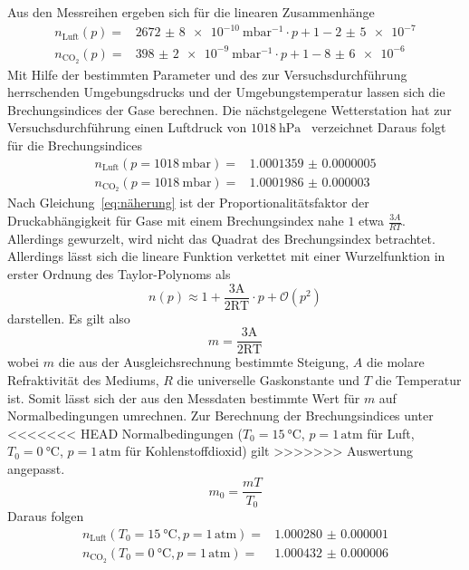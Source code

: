 Aus den Messreihen ergeben sich für die linearen Zusammenhänge
%
\begin{align}
  n_{\text{Luft}}(p)=&\SI{2672(8)e-10}{\milli\bar^{-1}}
  \cdot p+1-\num{2(5)e-7} \\
  n_{\text{CO}_2}(p)=&\SI{398(2)e-9}{\milli\bar^{-1}}
  \cdot p+1-\num{8(6)e-6}
\end{align}
%
Mit Hilfe der bestimmten Parameter und des zur Versuchsdurchführung herrschenden
Umgebungsdrucks und der Umgebungstemperatur lassen sich die Brechungsindices der
Gase berechnen. Die nächstgelegene Wetterstation hat zur Versuchsdurchführung
einen Luftdruck von $\SI{1018}{\hecto\pascal}$~\cite{wetteronline} verzeichnet
Daraus folgt für die Brechungsindices
%
\begin{align}
  n_{\text{Luft}}(p=\SI{1018}{\milli\bar})=&\num{1.0001359(5)} \\
  n_{\text{CO}_2}(p=\SI{1018}{\milli\bar})=&\num{1.0001986(30)}
\end{align}
%
Nach Gleichung~\eqref{eq:näherung} ist der Proportionalitätsfaktor
der Druckabhängigkeit für Gase mit einem Brechungsindex nahe $1$ etwa
$\frac{3A}{RT}$. Allerdings gewurzelt, wird nicht das Quadrat des
Brechungsindex betrachtet. Allerdings lässt sich die lineare Funktion verkettet
mit einer Wurzelfunktion in erster Ordnung des Taylor-Polynoms als
%
\begin{equation*}
  n(p)\approx1+\frac{3\mathup{A}}{2\mathup{RT}}\cdot p + \mathcal{O}(p^2)
\end{equation*}
%
darstellen. Es gilt also
%
\begin{equation}
  m=\frac{3\mathup{A}}{2\mathup{RT}}
\end{equation}
%
wobei $m$ die aus der Ausgleichsrechnung bestimmte Steigung, $A$ die molare
Refraktivität des Mediums, $R$ die universelle Gaskonstante und $T$ die
Temperatur ist. Somit lässt sich der aus den Messdaten bestimmte Wert für $m$
auf Normalbedingungen umrechnen. Zur Berechnung der Brechungsindices unter
<<<<<<< HEAD
Normalbedingungen ($T_0=\SI{15}{\celsius}$, $p=1\,\text{atm}$ für Luft,
$T_0=\SI{0}{\celsius}$, $p=1\,\text{atm}$ für Kohlenstoffdioxid) gilt
%
>>>>>>> Auswertung angepasst.
\begin{equation}
  m_0=\frac{mT}{T_0}
\end{equation}
%
Daraus folgen
%
\begin{align}
  n_{\text{Luft}}(T_0=\SI{15}{\celsius}, p=1\,\text{atm})=&\num{1.000280(1)} \\
  n_{\text{CO}_2}(T_0=\SI{0}{\celsius}, p=1\,\text{atm})=&\num{1.000432(6)}
\end{align}

